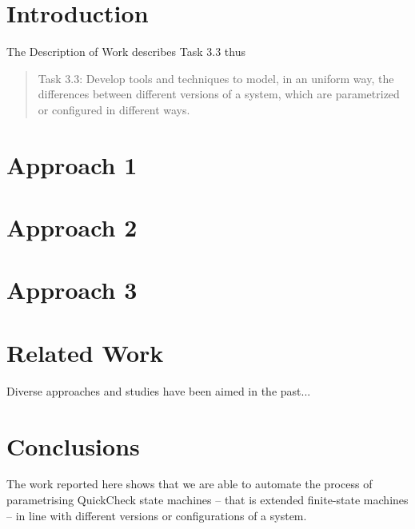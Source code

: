 \section{Introduction}

The Description of Work describes Task 3.3 thus
\begin{quote}
Task 3.3: Develop tools and techniques to model, in an uniform way, the differences between different versions of
a system, which are parametrized or configured in different ways.
\end{quote}

\section{Approach 1}
\label{approach1}

\section{Approach 2}
\label{approach2}

\section{Approach 3}
\label{approach3}


\section{Related Work}
\label{related_work}

Diverse approaches and studies have been aimed in the past...


\section{Conclusions}
\label{concs}

The work reported here shows that we are able to automate the process of parametrising QuickCheck state machines -- that 
is extended finite-state machines -- in line with different versions or configurations of a system.

